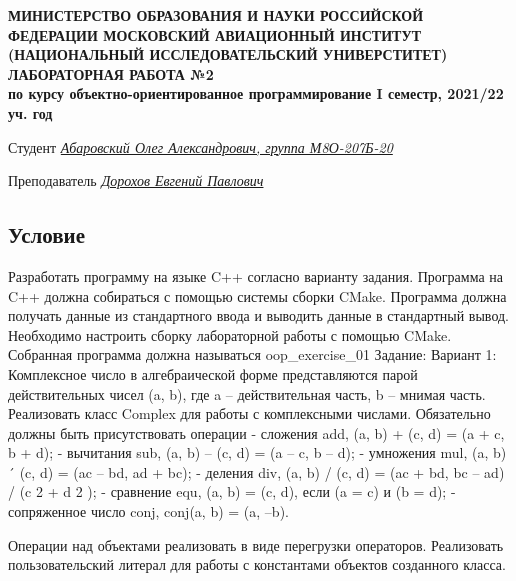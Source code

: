 \documentclass[12pt]{article}
\begin{document}
\begin{titlepage}
\begin{center}
\textbf{МИНИСТЕРСТВО ОБРАЗОВАНИЯ И НАУКИ РОССИЙСКОЙ ФЕДЕРАЦИИ
\medskip
МОСКОВСКИЙ АВИАЦИОННЫЙ ИНСТИТУТ
(НАЦИОНАЛЬНЫЙ ИССЛЕДОВАТЕЛЬСКИЙ УНИВЕРСТИТЕТ)
\vfill\vfill
{\Huge ЛАБОРАТОРНАЯ РАБОТА №2} \\
по курсу объектно-ориентированное программирование
I семестр, 2021/22 уч. год}
\end{center}
\vfill

Студент \uline{\it {Абаровский Олег Александрович, группа М8О-207Б-20}\hfill}

Преподаватель \uline{\it {Дорохов Евгений Павлович}\hfill}

\vfill
\end{titlepage}

\subsection*{Условие}

Разработать программу на языке C++ согласно варианту задания. Программа на C++ должна собираться с помощью системы сборки CMake. Программа должна получать данные из стандартного ввода и выводить данные в стандартный вывод. \newline
Необходимо настроить сборку лабораторной работы с помощью CMake. Собранная
программа должна называться oop\_exercise\_01 \newline
Задание: \newline
Вариант 1: Комплексное число в алгебраической форме представляются парой
действительных чисел (a, b), где a – действительная часть, b – мнимая
часть. Реализовать класс Complex для работы с комплексными числами.\newline
Обязательно должны быть присутствовать операции\newline
- сложения add, (a, b) + (c, d) = (a + c, b + d);\newline
- вычитания sub, (a, b) – (c, d) = (a – c, b – d);\newline
- умножения mul, (a, b) ´ (c, d) = (ac – bd, ad + bc);\newline
- деления div, (a, b) / (c, d) = (ac + bd, bc – ad) / (c 2 + d 2 );\newline
- сравнение equ, (a, b) = (c, d), если (a = c) и (b = d);\newline
- сопряженное число conj, conj(a, b) = (a, –b).\newline

Операции над объектами реализовать в виде перегрузки операторов.\newline
Реализовать пользовательский литерал для работы с константами объектов
созданного класса.
\end{document}

